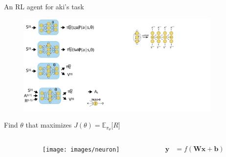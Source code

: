 \documentclass[14pt]{beamer}
\begin{document}
\begin{frame}{An RL agent for aki's task}
  
\begin{figure}[htb]
  \includegraphics[width=0.9\textwidth]{images/ffnn}
\end{figure}

Find $\theta$ that maximizes $J(\theta) = \mathbb{E}_{\pi_{\theta}} \lbrack R \rbrack $

\vspace{0.2cm}

\begin{columns}

\begin{column}{0.1\textwidth}
\end{column}

\begin{column}{0.4\textwidth}
  \begin{figure}[htb]
    \texttt{[image: images/neuron]}
  \end{figure}
\end{column}

\begin{column}{0.4\textwidth}
  \begin{align*}
    \mathbf{y} &= f \left(\mathbf{W} \mathbf{x} + \mathbf{b} \right)
  \end{align*}
\end{column}

\begin{column}{0.1\textwidth}
\end{column}

\end{columns}


\end{frame}
\end{document}
